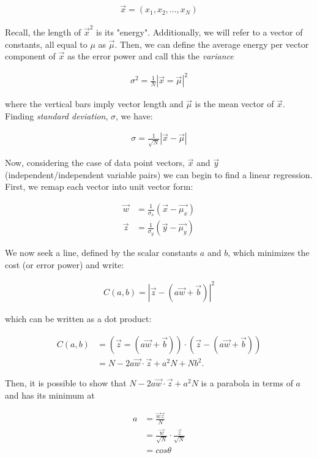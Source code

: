 \documentclass[11pt,a4paper]{article}
\begin{document}
\begin{align*}
\vec{x} = (x_1, x_2, \ldots, x_N)
\end{align*}

Recall, the length of $\vec{x}^2$ is its "energy". Additionally, we will refer to a vector of constants, all equal to $\mu$ as $\vec{\mu}$.
Then, we can define the average energy per vector component of $\vec{x}$ as the error power and call this the \textit{variance}

\begin{align*}
\sigma^2 = \frac{1}{N} |\vec{x} = \vec{\mu}|^2
\end{align*}

where the vertical bars imply vector length and $\vec{\mu}$ is the mean vector of $\vec{x}$.
Finding \textit{standard deviation}, $\sigma$, we have:

\begin{align*}
\sigma = \frac{1}{\sqrt{N}} |\vec{x} - \vec{\mu}|
\end{align*}

Now, considering the case of data point vectors, $\vec{x}$ and $\vec{y}$ (independent/independent variable pairs) we can begin to find a linear regression.
First, we remap each vector into unit vector form:

\begin{align*}
\vec{w} &= \frac{1}{\sigma_x}(\vec{x} - \vec{\mu_x}) \\
\vec{z} &= \frac{1}{\sigma_y}(\vec{y} - \vec{\mu_y})
\end{align*}

We now seek a line, defined by the scalar constants $a$ and $b$, which minimizes the cost (or error power) and write:

\begin{align*}
C(a,b) = |\vec{z} - (a\vec{w} + \vec{b})|^2
\end{align*}

which can be written as a dot product:

\begin{align*}
C(a,b) &= (\vec{z} = (a\vec{w} + \vec{b})) \cdot (\vec{z} - (a\vec{w} + \vec{b})) \\
&= N - 2a\vec{w} \cdot \vec{z} + a^2 N + Nb^2.
\end{align*}

Then, it is possible to show that $N - 2a\vec{w} \cdot \vec{z} + a^2 N$ is a parabola in terms of $a$ and has its minimum at

\begin{align*}
a &= \frac{\vec{w}\vec{z}}{N} \\
&= \frac{\vec{w}}{\sqrt{N}} \cdot \frac{\vec{z}}{\sqrt{N}} \\
&= cos\theta
\end{align*}
\end{document}
